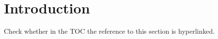\documentclass{article}
\begin{document}
\tableofcontents
\section{Introduction}
Check whether in the TOC the reference to this section is hyperlinked.
\end{document}
